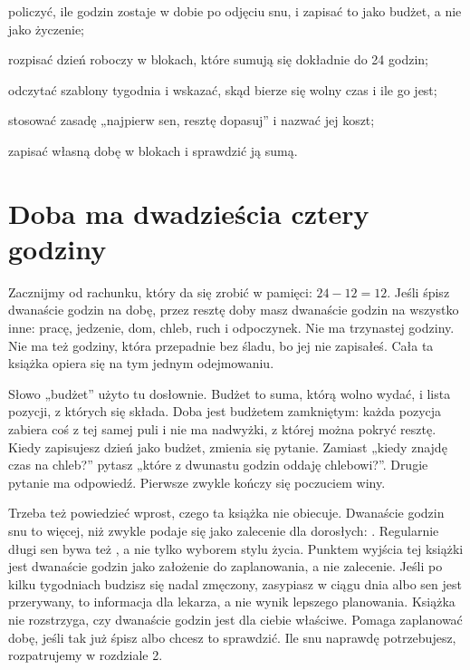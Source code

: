 
\begin{cele}
\item policzyć, ile godzin zostaje w dobie po odjęciu snu, i zapisać to jako budżet, a nie jako życzenie;
\item rozpisać dzień roboczy w blokach, które sumują się dokładnie do 24 godzin;
\item odczytać szablony tygodnia i wskazać, skąd bierze się wolny czas i ile go jest;
\item stosować zasadę „najpierw sen, resztę dopasuj” i nazwać jej koszt;
\item zapisać własną dobę w blokach i sprawdzić ją sumą.
\end{cele}

\section{Doba ma dwadzieścia cztery godziny}

Zacznijmy od rachunku, który da się zrobić w pamięci: $24 - 12 = 12$. Jeśli śpisz dwanaście godzin na dobę, przez resztę doby masz dwanaście godzin na wszystko inne: pracę, jedzenie, dom, chleb, ruch i odpoczynek. Nie ma trzynastej godziny. Nie ma też godziny, która przepadnie bez śladu, bo jej nie zapisałeś. Cała ta książka opiera się na tym jednym odejmowaniu.

Słowo „budżet” użyto tu dosłownie. Budżet to suma, którą wolno wydać, i lista pozycji, z których się składa. Doba jest budżetem zamkniętym: każda pozycja zabiera coś z tej samej puli i nie ma nadwyżki, z której można pokryć resztę. Kiedy zapisujesz dzień jako budżet, zmienia się pytanie. Zamiast „kiedy znajdę czas na chleb?” pytasz „które z dwunastu godzin oddaję chlebowi?”. Drugie pytanie ma odpowiedź. Pierwsze zwykle kończy się poczuciem winy.

Trzeba też powiedzieć wprost, czego ta książka nie obiecuje. Dwanaście godzin snu to więcej, niż zwykle podaje się jako zalecenie dla dorosłych: . Regularnie długi sen bywa też , a nie tylko wyborem stylu życia. Punktem wyjścia tej książki jest dwanaście godzin jako założenie do zaplanowania, a nie zalecenie. Jeśli po kilku tygodniach budzisz się nadal zmęczony, zasypiasz w ciągu dnia albo sen jest przerywany, to informacja dla lekarza, a nie wynik lepszego planowania. Książka nie rozstrzyga, czy dwanaście godzin jest dla ciebie właściwe. Pomaga zaplanować dobę, jeśli tak już śpisz albo chcesz to sprawdzić. Ile snu naprawdę potrzebujesz, rozpatrujemy w rozdziale 2.


